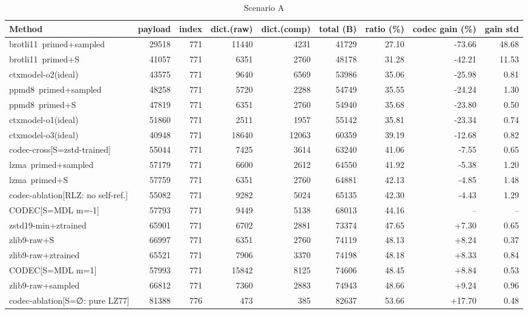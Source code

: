 \begin{table}[h]\centering\footnotesize\caption{Scenario A}\begin{tabular}{lrrrrrrrr}\toprule
Method & payload & index & dict.(raw) & dict.(comp) & total (B) & ratio (\%) & codec gain (\%) & gain std \\\midrule
brotli11~primed+sampled & 29518 & 771 & 11440 & 4231 & 41729 & 27.10 & -73.66 & 48.68 \\
brotli11~primed+S & 41057 & 771 & 6351 & 2760 & 48178 & 31.28 & -42.21 & 11.53 \\
ctxmodel-o2(ideal) & 43575 & 771 & 9640 & 6569 & 53986 & 35.06 & -25.98 & 0.81 \\
ppmd8~primed+sampled & 48258 & 771 & 5720 & 2288 & 54749 & 35.55 & -24.24 & 1.30 \\
ppmd8~primed+S & 47819 & 771 & 6351 & 2760 & 54940 & 35.68 & -23.80 & 0.50 \\
ctxmodel-o1(ideal) & 51860 & 771 & 2511 & 1957 & 55142 & 35.81 & -23.34 & 0.74 \\
ctxmodel-o3(ideal) & 40948 & 771 & 18640 & 12063 & 60359 & 39.19 & -12.68 & 0.82 \\
codec-cross[S=zstd-trained] & 55044 & 771 & 7425 & 3614 & 63240 & 41.06 & -7.55 & 0.65 \\
lzma~primed+sampled & 57179 & 771 & 6600 & 2612 & 64550 & 41.92 & -5.38 & 1.20 \\
lzma~primed+S & 57759 & 771 & 6351 & 2760 & 64881 & 42.13 & -4.85 & 1.48 \\
codec-ablation[RLZ: no self-ref.] & 55082 & 771 & 9282 & 5024 & 65135 & 42.30 & -4.43 & 1.29 \\
CODEC[S=MDL m=-1] & 57793 & 771 & 9449 & 5138 & 68013 & 44.16 & -- & -- \\
zstd19-min+ztrained & 65901 & 771 & 6702 & 2881 & 73374 & 47.65 & +7.30 & 0.65 \\
zlib9-raw+S & 66997 & 771 & 6351 & 2760 & 74119 & 48.13 & +8.24 & 0.37 \\
zlib9-raw+ztrained & 65521 & 771 & 7906 & 3370 & 74198 & 48.18 & +8.33 & 0.84 \\
CODEC[S=MDL m=1] & 57993 & 771 & 15842 & 8125 & 74606 & 48.45 & +8.84 & 0.53 \\
zlib9-raw+sampled & 66812 & 771 & 7360 & 2883 & 74943 & 48.66 & +9.24 & 0.96 \\
codec-ablation[S=∅: pure LZ77] & 81388 & 776 & 473 & 385 & 82637 & 53.66 & +17.70 & 0.48 \\

\end{tabular}
\end{table}
